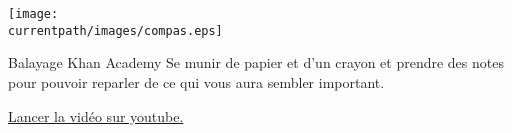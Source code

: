 

\hspace{1cm}

\begin{center}
    \texttt{[image: \\currentpath/images/compas.eps]}
\end{center}

\hspace{1cm}

\begin{center}
    \begin{myBox}{Balayage Khan Academy}
        Se munir de papier et d'un crayon et prendre des notes pour pouvoir reparler de ce qui vous aura sembler important.

        \bigskip
        
        \href{https://www.yout-ube.com/watch?v=hq9sszKKYc8}{ Lancer la vidéo sur youtube.}
    \end{myBox}
\end{center}

% 
